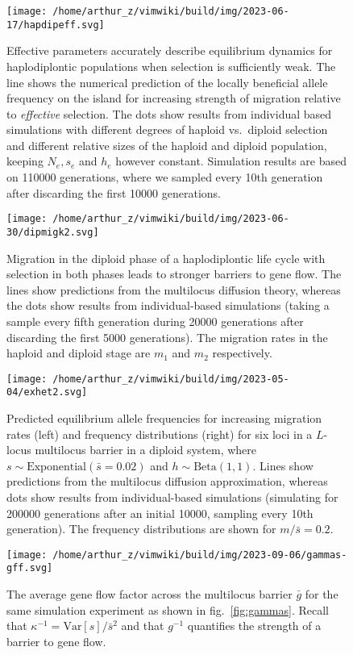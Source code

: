 \documentclass[
  11pt,
]{article}
\begin{document}
\begin{figure}
\hypertarget{fig:hapdipeff}{%
\centering
\texttt{[image: /home/arthur\_z/vimwiki/build/img/2023-06-17/hapdipeff.svg]}
\caption{Effective parameters accurately describe equilibrium dynamics
for haplodiplontic populations when selection is sufficiently weak. The
line shows the numerical prediction of the locally beneficial allele
frequency on the island for increasing strength of migration relative to
\emph{effective} selection. The dots show results from individual based
simulations with different degrees of haploid vs.~diploid selection and
different relative sizes of the haploid and diploid population, keeping
\(N_e, s_e\) and \(h_e\) however constant. Simulation results are based
on 110000 generations, where we sampled every 10th generation after
discarding the first 10000 generations.}\label{fig:hapdipeff}
}
\end{figure}

\begin{figure}
\hypertarget{fig:dipmig}{%
\centering
\texttt{[image: /home/arthur\_z/vimwiki/build/img/2023-06-30/dipmigk2.svg]}
\caption{Migration in the diploid phase of a haplodiplontic life cycle
with selection in both phases leads to stronger barriers to gene flow.
The lines show predictions from the multilocus diffusion theory, whereas
the dots show results from individual-based simulations (taking a sample
every fifth generation during 20000 generations after discarding the
first 5000 generations). The migration rates in the haploid and diploid
stage are \(m_1\) and \(m_2\) respectively.}\label{fig:dipmig}
}
\end{figure}

\begin{figure}
\centering
\texttt{[image: /home/arthur\_z/vimwiki/build/img/2023-05-04/exhet2.svg]}
\caption{Predicted equilibrium allele frequencies for increasing
migration rates (left) and frequency distributions (right) for six loci
in a \(L\)-locus multilocus barrier in a diploid system, where
\(s \sim \mathrm{Exponential}(\bar{s}=0.02)\) and
\(h \sim \mathrm{Beta}(1,1)\). Lines show predictions from the
multilocus diffusion approximation, whereas dots show results from
individual-based simulations (simulating for 200000 generations after an
initial 10000, sampling every 10th generation). The frequency
distributions are shown for \(m/\bar{s} = 0.2\). \label{fig:het}}
\end{figure}

\begin{figure}
\hypertarget{fig:gffgammas}{%
\centering
\texttt{[image: /home/arthur\_z/vimwiki/build/img/2023-09-06/gammas-gff.svg]}
\caption{The average gene flow factor across the multilocus barrier
\(\bar{g}\) for the same simulation experiment as shown in
fig.~\ref{fig:gammas}. Recall that
\(\kappa^{-1} = \mathrm{Var}[s]/\bar{s}^2\) and that \(g^{-1}\)
quantifies the strength of a barrier to gene flow.}\label{fig:gffgammas}
}
\end{figure}
\end{document}

